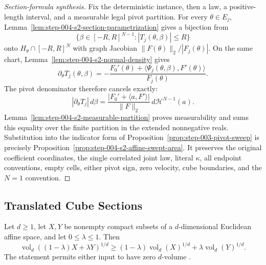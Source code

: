 \begin{proof}[Section-formula synthesis]
Fix the deterministic instance, then a law, a positive-length interval, and
a measurable legal pivot partition.  For every $\theta\in E_j$,
Lemma~\ref{lem:step-004-s2-section-parametrization} gives a bijection from
\begin{equation}
\label{eq:appendix-display-145}
\{\beta\in[-R,R]^{N-1}:|T_j(\theta,\beta)|\leq R\}
\end{equation}
onto $H_\theta\cap[-R,R]^N$ with graph Jacobian
$\|F(\theta)\|_2/|F_j(\theta)|$.  On the same chart,
Lemma~\ref{lem:step-004-s2-normal-density} gives
\begin{equation}
\label{eq:appendix-display-146}
\partial_\theta T_j(\theta,\beta)
=-
\frac{F_0'(\theta)+\langle\Psi_j(\theta,\beta),F'(\theta)\rangle}
{F_j(\theta)}.
\end{equation}
The pivot denominator therefore cancels exactly:
\begin{equation}
\label{eq:appendix-display-147}
|\partial_\theta T_j|\,d\beta
=
\frac{|F_0'+\langle a,F'\rangle|}{\|F\|_2}
\,d\mathcal H^{N-1}(a).
\end{equation}
Lemma~\ref{lem:step-004-s2-measurable-partition} proves measurability and
sums this equality over the finite partition in the extended nonnegative
reals.  Substitution into the indicator form of
Proposition~\ref{prop:step-003-pivot-sweep} is precisely
Proposition~\ref{prop:step-004-s2-affine-swept-area}.  It preserves the
original coefficient coordinates, the single correlated joint law, literal
$\kappa$, all endpoint conventions, empty cells, either pivot sign, zero
velocity, cube boundaries, and the $N=1$ convention.
\end{proof}

\subsection{Translated Cube Sections}\label{app:step-005}

\begin{theorem}\label{thm:brunn-minkowski}
Let $d\geq1$, let $X,Y$ be nonempty compact subsets of a $d$-dimensional Euclidean affine space, and let
$0\leq\lambda\leq1$. Then
\begin{equation}
\label{eq:appendix-display-148}
\operatorname{vol}_d((1-\lambda)X+\lambda Y)^{1/d}
\geq(1-\lambda)\operatorname{vol}_d(X)^{1/d}
+\lambda\operatorname{vol}_d(Y)^{1/d}.
\end{equation}
The statement permits either input to have zero $d$-volume \citep{gardner2002brunn}.
\end{theorem}

